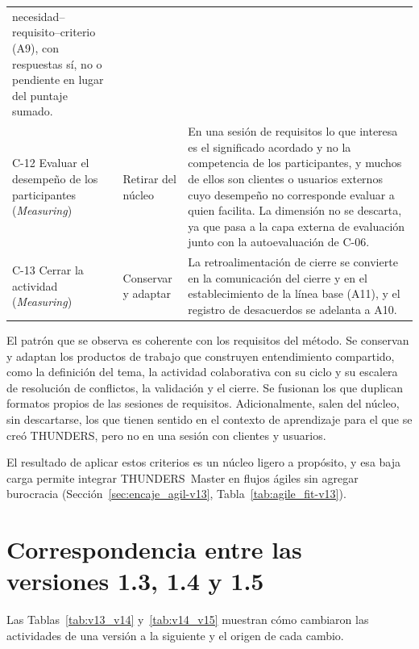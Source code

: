 \documentclass[12pt,letterpaper,oneside]{report}
\begin{document}
{\begin{xltabular}{\textwidth}{@{}>{\raggedright\arraybackslash}p{0.25\textwidth}
                                >{\raggedright\arraybackslash}p{0.14\textwidth}
                                >{\raggedright\arraybackslash}X@{}}
  necesidad--requisito--criterio (A9), con respuestas sí, no o pendiente en
  lugar del puntaje sumado. \\
C-12 Evaluar el desempeño de los participantes (\textit{Measuring}) & Retirar del núcleo
& En una sesión de requisitos lo que interesa es el significado acordado y no
  la competencia de los participantes, y muchos de ellos son clientes o
  usuarios externos cuyo desempeño no corresponde evaluar a quien facilita. La
  dimensión no se descarta, ya que pasa a la capa externa de evaluación junto
  con la autoevaluación de C-06. \\
C-13 Cerrar la actividad (\textit{Measuring}) & Conservar y adaptar
& La retroalimentación de cierre se convierte en la comunicación del cierre y
  en el establecimiento de la línea base (A11), y el registro de desacuerdos se
  adelanta a A10. \\
\end{xltabular}}

El patrón que se observa es coherente con los requisitos del método. Se
conservan y adaptan los productos de trabajo que construyen entendimiento compartido, como la
definición del tema, la actividad colaborativa con su ciclo y su escalera de
resolución de conflictos, la validación y el cierre. Se fusionan los que duplican formatos
propios de las sesiones de requisitos. Adicionalmente, salen del núcleo, sin descartarse, los
que tienen sentido en el contexto de aprendizaje para el que se creó THUNDERS,
pero no en una sesión con clientes y usuarios.

El resultado de aplicar estos criterios es un núcleo ligero a propósito, y esa
baja carga permite integrar THUNDERS~Master en flujos ágiles sin
agregar burocracia (Sección~\ref{sec:encaje_agil-v13}, Tabla~\ref{tab:agile_fit-v13}).

\section{Correspondencia entre las versiones 1.3, 1.4 y 1.5}
Las Tablas~\ref{tab:v13_v14} y~\ref{tab:v14_v15} muestran cómo cambiaron las actividades de una versión a la siguiente y el origen de cada cambio.
\end{document}
